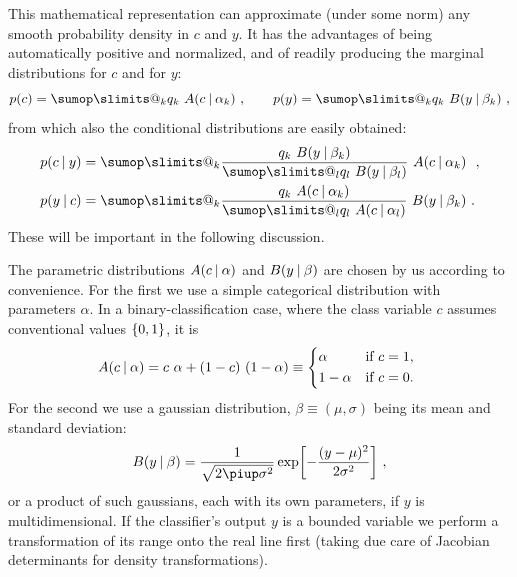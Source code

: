 \documentclass[\ifafour a4paper,12pt,\else a5paper,10pt,\fi%
onecolumn,oneside,article,%
british%
]{memoir}
\makeatletter
\theoremstyle{remark}
\theoremstyle{innote}
\def\sum{\DOTSI\sumop\slimits@}
\newcommand*{\pu}{\piup}%
\DeclarePairedDelimiter\set{\{}{\}} %
\renewcommand*{\|}[1][]{\nonscript\:#1\vert\nonscript\:\mathopen{}}
\makeatother
\begin{document}
This mathematical representation can approximate (under some norm) any smooth probability density in $c$ and $y$. It has the advantages of being automatically positive and normalized, and of readily producing the marginal distributions for $c$ and for $y$:
\begin{equation}
  \label{eq:marginals}
  p(c) = \sum_{k} q_{k}\ A(c \| \alpha_{k})\ ,
  \qquad
  p(y) = \sum_{k} q_{k}\ B(y \| \beta_{k}) \ ,
\end{equation}
from which also the conditional distributions are easily obtained:
\begin{subequations} \label{eq:conditionals}
  \begin{align}
    \label{eq:conditional_c_given_y}
    p(c \| y) &= \sum_{k} \frac{q_{k}\ B(y \| \beta_{k})
                }{\sum_{l} q_{l}\ B(y \| \beta_{l})}\
                A(c \| \alpha_{k})\  \ ,
    \\
    \label{eq:conditional_y_given_c}
    p(y \| c) &= \sum_{k} \frac{q_{k}\ A(c \| \alpha_{k})
                }{\sum_{l} q_{l}\ A(c \| \alpha_{l})}\
                B(y \| \beta_{k}) \ .
  \end{align}
\end{subequations}
These will be important in the following discussion.

The parametric distributions $A(c \| \alpha)$ and $B(y \| \beta)$ are chosen by us according to convenience. For the first we use a simple categorical distribution with parameters $\alpha$. In a binary-classification case, where the class variable $c$ assumes conventional values $\set{0,1}$, it is
\begin{equation}
  \label{eq:distr_class}
  A(c \| \alpha) = c\ \alpha + (1-c)\ (1-\alpha) \equiv
  \begin{dcases*}
    \alpha& if $c=1$, \\ 1-\alpha & if $c=0$.
  \end{dcases*}
\end{equation}
For the second we use a gaussian distribution, $\beta \equiv (\mu,\sigma)$ being its mean and standard deviation:
\begin{equation}
  \label{eq:distr_output}
  B(y \| \beta) = \frac{1}{\sqrt{2\pu\sigma^{2}}} \exp\biggl[-\frac{(y-\mu)^{2}}{2\sigma^{2}}\biggr] \ ,
\end{equation}
or a product of such gaussians, each with its own parameters, if $y$ is multidimensional. If the classifier's output $y$ is a bounded variable we perform a transformation of its range onto the real line first (taking due care of Jacobian determinants for density transformations).
\end{document}
